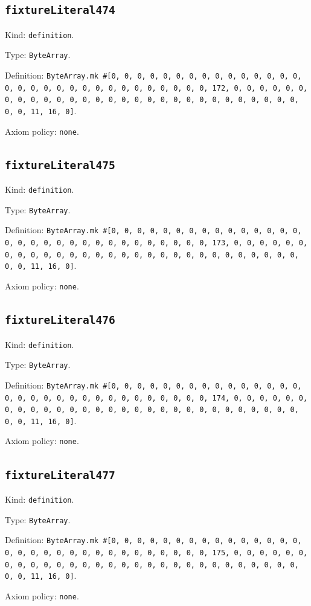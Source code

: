 \documentclass[11pt]{article}
\begin{document}
\subsection*{\texttt{fixtureLiteral474}}
\noindent Kind: \texttt{definition}.\par
\noindent Type: \texttt{ByteArray}.\par
\noindent Definition: \texttt{ByteArray.mk \#[0, 0, 0, 0, 0, 0, 0, 0, 0, 0, 0, 0, 0, 0, 0, 0, 0, 0, 0, 0, 0, 0, 0, 0, 0, 0, 0, 0, 0, 0, 0, 172, 0, 0, 0, 0, 0, 0, 0, 0, 0, 0, 0, 0, 0, 0, 0, 0, 0, 0, 0, 0, 0, 0, 0, 0, 0, 0, 0, 0, 0, 0, 0, 11, 16, 0]}.\par
\noindent Axiom policy: \texttt{none}.\par
\subsection*{\texttt{fixtureLiteral475}}
\noindent Kind: \texttt{definition}.\par
\noindent Type: \texttt{ByteArray}.\par
\noindent Definition: \texttt{ByteArray.mk \#[0, 0, 0, 0, 0, 0, 0, 0, 0, 0, 0, 0, 0, 0, 0, 0, 0, 0, 0, 0, 0, 0, 0, 0, 0, 0, 0, 0, 0, 0, 0, 173, 0, 0, 0, 0, 0, 0, 0, 0, 0, 0, 0, 0, 0, 0, 0, 0, 0, 0, 0, 0, 0, 0, 0, 0, 0, 0, 0, 0, 0, 0, 0, 11, 16, 0]}.\par
\noindent Axiom policy: \texttt{none}.\par
\subsection*{\texttt{fixtureLiteral476}}
\noindent Kind: \texttt{definition}.\par
\noindent Type: \texttt{ByteArray}.\par
\noindent Definition: \texttt{ByteArray.mk \#[0, 0, 0, 0, 0, 0, 0, 0, 0, 0, 0, 0, 0, 0, 0, 0, 0, 0, 0, 0, 0, 0, 0, 0, 0, 0, 0, 0, 0, 0, 0, 174, 0, 0, 0, 0, 0, 0, 0, 0, 0, 0, 0, 0, 0, 0, 0, 0, 0, 0, 0, 0, 0, 0, 0, 0, 0, 0, 0, 0, 0, 0, 0, 11, 16, 0]}.\par
\noindent Axiom policy: \texttt{none}.\par
\subsection*{\texttt{fixtureLiteral477}}
\noindent Kind: \texttt{definition}.\par
\noindent Type: \texttt{ByteArray}.\par
\noindent Definition: \texttt{ByteArray.mk \#[0, 0, 0, 0, 0, 0, 0, 0, 0, 0, 0, 0, 0, 0, 0, 0, 0, 0, 0, 0, 0, 0, 0, 0, 0, 0, 0, 0, 0, 0, 0, 175, 0, 0, 0, 0, 0, 0, 0, 0, 0, 0, 0, 0, 0, 0, 0, 0, 0, 0, 0, 0, 0, 0, 0, 0, 0, 0, 0, 0, 0, 0, 0, 11, 16, 0]}.\par
\noindent Axiom policy: \texttt{none}.\par
\end{document}
